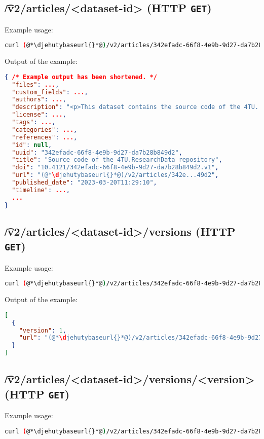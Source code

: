 \subsection{\t{/v2/articles/<dataset-id>} (HTTP \texttt{GET})}
\label{sec:v2-articles-dataset-id}
  Example usage:
\begin{lstlisting}[language=bash]
curl (@*\djehutybaseurl{}*@)/v2/articles/342efadc-66f8-4e9b-9d27-da7b28b849d2 | jq
\end{lstlisting}

  Output of the example:
\begin{lstlisting}[language=JSON]
{ /* Example output has been shortened. */
  "files": ...,
  "custom_fields": ...,
  "authors": ...,
  "description": "<p>This dataset contains the source code of the 4TU...",
  "license": ...,
  "tags": ...,
  "categories": ...,
  "references": ...,
  "id": null,
  "uuid": "342efadc-66f8-4e9b-9d27-da7b28b849d2",
  "title": "Source code of the 4TU.ResearchData repository",
  "doi": "10.4121/342efadc-66f8-4e9b-9d27-da7b28b849d2.v1",
  "url": "(@*\djehutybaseurl{}*@)/v2/articles/342e...49d2",
  "published_date": "2023-03-20T11:29:10",
  "timeline": ...,
  ...
}
\end{lstlisting}

\subsection{\t{/v2/articles/<dataset-id>/versions} (HTTP \texttt{GET})}

  Example usage:
\begin{lstlisting}[language=bash]
curl (@*\djehutybaseurl{}*@)/v2/articles/342efadc-66f8-4e9b-9d27-da7b28b849d2/versions | jq
\end{lstlisting}

  Output of the example:
\begin{lstlisting}[language=JSON]
[
  {
    "version": 1,
    "url": "(@*\djehutybaseurl{}*@)/v2/articles/342efadc-66f8-4e9b-9d27-da7b28b849d2/versions/1"
  }
]
\end{lstlisting}

\subsection{\t{/v2/articles/<dataset-id>/versions/<version>} (HTTP \texttt{GET})}

  Example usage:
\begin{lstlisting}[language=bash]
curl (@*\djehutybaseurl{}*@)/v2/articles/342efadc-66f8-4e9b-9d27-da7b28b849d2/versions/1 | jq
\end{lstlisting}

